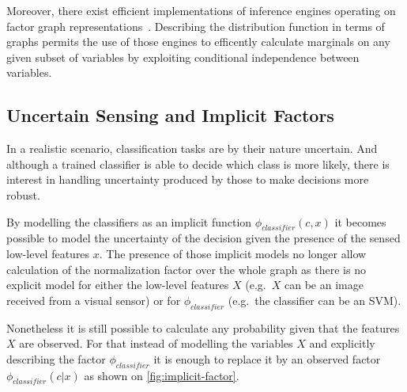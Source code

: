 Moreover, there exist efficient implementations of inference engines operating on factor
graph representations~\cite{Mooij_libDAI_10}.
Describing the distribution function in terms of graphs permits the use of those engines to
efficently calculate marginals on any given subset of variables by exploiting conditional
independence between variables.

\subsection{Uncertain Sensing and Implicit Factors}
\label{sec:cues-from-low-level}
In a realistic scenario, classification tasks are by their nature uncertain.
And although a trained classifier is able to decide which class is more likely, there is
interest in handling uncertainty produced by those to make decisions more robust.

By modelling the classifiers as an implicit function $\phi_{classifier}(c, x)$ it becomes
possible to model the uncertainty of the decision given the presence of the sensed low-level
features $x$. The presence of those implicit models no longer allow calculation of the
normalization factor over the whole graph as there is no explicit model for either the
low\hyp{}level features $X$ (e.g.\ $X$ can be an image received from a visual sensor)
or for $\phi_{classifier}$ (e.g.\ the classifier can be an \gls{SVM}).

Nonetheless it is still possible to calculate any probability given that the features $X$
are observed. For that instead of modelling the variables $X$ and explicitly describing
the factor $\phi_{classifier}$ it is enough to replace it by an observed factor
$\phi_{classifier}(c|x)$ as shown on \autoref{fig:implicit-factor}.


